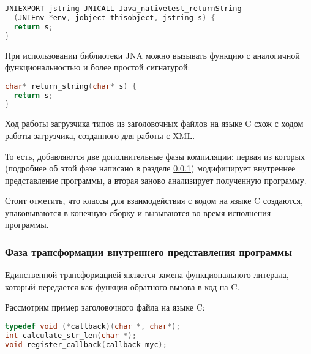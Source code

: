 \begin{code}\begin{lstlisting}[language=C, caption={Пример функции на языке C, которая доступна для вызова через библиотеку JNI.}, label=jni-example]
JNIEXPORT jstring JNICALL Java_nativetest_returnString
  (JNIEnv *env, jobject thisobject, jstring s) {
  return s;
}
\end{lstlisting}\end{code}

\begin{code}
При использовании библиотеки JNA можно вызывать функцию с аналогичной функциональностью и более простой сигнатурой:
\begin{lstlisting}[language=C, caption={Пример функции на языке C, аналогичной функции из примера~\ref{jni-example}, которая доступна для вызова через библиотеку JNA.}, label=jna-example]
char* return_string(char* s) {
  return s;
}
\end{lstlisting}\end{code}

Ход работы загрузчика типов из заголовочных файлов на языке C схож с ходом работы загрузчика, созданного для работы с XML.

То есть, добавляются две дополнительные фазы компиляции: первая из которых (подробнее об этой фазе написано в разделе \ref{c-tranformation-phase}) модифицирует внутреннее представление программы, а вторая заново анализирует полученную программу.

Стоит отметить, что классы для взаимодействия с кодом на языке C создаются, упаковываются в конечную сборку и вызываются во время исполнения программы.

\subsubsection{Фаза трансформации внутреннего представления программы}\label{c-tranformation-phase}
Единственной трансформацией является замена функционального литерала, который передается как функция обратного вызова в код на C.

Рассмотрим пример заголовочного файла на языке C:

\begin{code}\begin{lstlisting}[language=C, caption={Пример заголовочного файла на языке C с декларацией функции обратного вызова.}, label=callback-c-example]
typedef void (*callback)(char *, char*);
int calculate_str_len(char *);
void register_callback(callback myc);
\end{lstlisting}\end{code}

